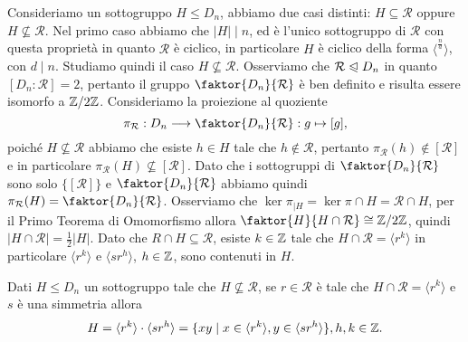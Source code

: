 \documentclass[11pt]{scrartcl}
\begin{document}
Consideriamo un sottogruppo $H\leq D_n$, abbiamo due casi distinti: 
$H \subseteq \mathcal{R}$ oppure $H \nsubseteq \mathcal{R}$. Nel primo caso
abbiamo che $|H|\mid n$, ed è l'unico sottogruppo di $\mathcal{R}$ con questa 
proprietà in quanto $\mathcal{R}$ è ciclico, in particolare $H$ è ciclico 
della forma $\langle ^{\frac n d}\rangle$, con $d \mid n$. \newline
Studiamo quindi il caso $H \nsubseteq \mathcal{R}$. Osserviamo che 
$\mathcal{R}\trianglelefteqslant D_n$ in quanto $[D_n : \mathcal{R}] = 2$,
pertanto il gruppo $\faktor{D_n}{\mathcal{R}}$ è ben definito e risulta essere 
isomorfo a $\mathbb{Z}/{2}\mathbb{Z}$. \newline
Consideriamo la proiezione al quoziente \[
    \pi_{\mathcal{R}}: D_n \longrightarrow \faktor{D_n}{\mathcal{R}} : g \mapsto [g],
\]poiché $H \nsubseteq \mathcal{R}$ abbiamo che esiste $h \in H$ tale che 
$h \notin \mathcal{R}$, pertanto $\pi_{\mathcal{R}}(h) \notin [\mathcal{R}]$ e
in particolare $\pi_{\mathcal{R}}(H) \nsubseteq [\mathcal{R}]$. Dato che i 
sottogruppi di $\faktor{D_n}{\mathcal{R}}$ sono solo $\{[\mathcal{R}]\}$ e
$\faktor{D_n}{\mathcal{R}}$ abbiamo quindi $\pi_{\mathcal{R}}(H) = 
\faktor{D_n}{\mathcal{R}}$. Osserviamo che $\ker \pi_{\mid H} = 
\ker \pi \cap H = \mathcal{R}\cap H$, per il Primo Teorema di Omomorfismo
allora $\faktor{H}{H\cap \mathcal{R}} \cong \Z2$, quindi 
$|H\cap\mathcal{R}| = \displaystyle\frac 1 2 |H|$. Dato che $R\cap H \subseteq
\mathcal{R}$, esiste $k \in \mathbb Z$ tale che $H\cap\mathcal{R} = \langle r^k\rangle$
in particolare $\langle r^k\rangle$ e $\langle sr^h\rangle$, $h \in \mathbb Z$, sono
contenuti in $H$. 

\begin{proposition}
    \label{prop2.0}
    Dati $H\leq D_n$ un sottogruppo tale che $H\nsubseteq \mathcal{R}$, se
    $r \in \mathcal{R}$ è tale che $H\cap\mathcal{R} = \langle r^k\rangle$ 
    e $s$ è una simmetria allora \[
    H = \langle r^k\rangle\cdot\langle sr^h\rangle = \{xy \mid x \in \langle r^k\rangle,
    y \in \langle sr^h\rangle\}, h, k \in \mathbb Z.    
    \]
\end{proposition}
\end{document}
